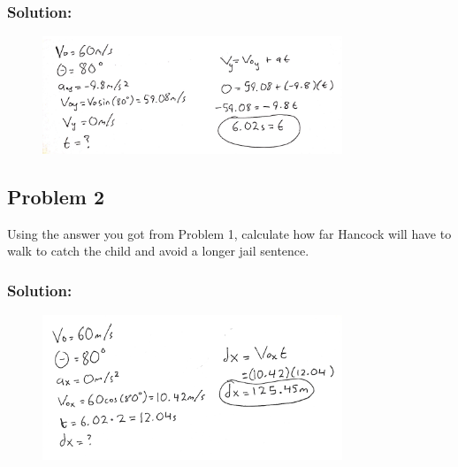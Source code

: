 \documentclass[a4paper,12pt]{article}
\begin{document}
\subsubsection{Solution:}

\begin{figure}[h]
    \centering
    \includegraphics[width=0.8\textwidth]{U1P1S} %
\end{figure}

\newpage

\subsection{Problem 2}

Using the answer you got from Problem 1, calculate how far Hancock will have to walk to catch the child and avoid a longer jail sentence.

\subsubsection{Solution:}

\begin{figure}[h]
    \centering
    \includegraphics[width=0.8\textwidth]{U1P2S} %
\end{figure}
\end{document}
